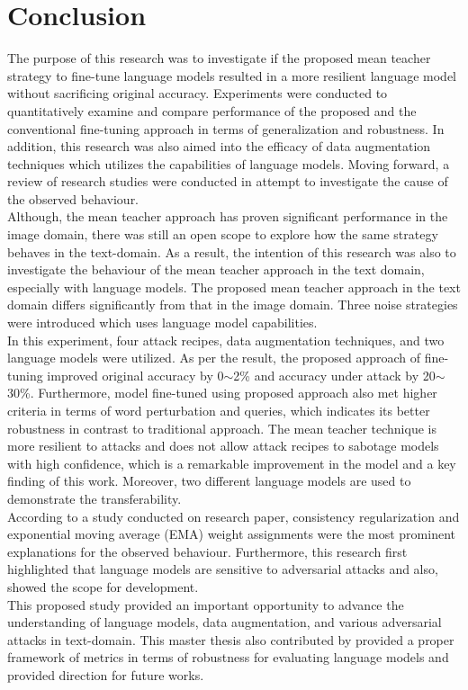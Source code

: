 \documentclass[%
	BCOR=8mm, %
	DIV=12,
	toc=bibliography, %
	toc=listof, %
	oneside, %
	egregdoesnotlikesansseriftitles, %
	]{scrbook}
\begin{document}
\section{Conclusion}
\label{section:conclusion}
The purpose of this research was to investigate if the proposed mean teacher strategy to fine-tune language models resulted in a more resilient language model without sacrificing original accuracy. Experiments were conducted to quantitatively examine and compare performance of the proposed and the conventional fine-tuning approach in terms of generalization and robustness. In addition, this research was also aimed into the efficacy of data augmentation techniques which utilizes the capabilities of language models. Moving forward, a review of research studies were conducted in attempt to investigate the cause of the observed behaviour. \\
Although, the mean teacher approach has proven significant performance in the image domain, there was still an open scope to explore how the same strategy behaves in the text-domain. As a result, the intention of this research was also to investigate the behaviour of the mean teacher approach in the text domain, especially with language models. The proposed mean teacher approach in the text domain differs significantly from that in the image domain. Three noise strategies were introduced which uses language model capabilities.\\
In this experiment, four attack recipes, data augmentation techniques, and two language models were utilized. As per the result, the proposed approach of fine-tuning improved original accuracy by 0$\sim$2\% and accuracy under attack by 20$\sim$30\%. Furthermore, model fine-tuned using proposed approach also met higher criteria in terms of word perturbation and queries, which indicates its better robustness in contrast to traditional approach. The mean teacher technique is more resilient to attacks and does not allow attack recipes to sabotage models with high confidence, which is a remarkable improvement in the model and a key finding of this work. Moreover, two different language models are used to demonstrate the transferability.\\
According to a study conducted on research paper, consistency regularization and exponential moving average (EMA) weight assignments were the most prominent explanations for the observed behaviour.
Furthermore, this research first highlighted that language models are sensitive to adversarial attacks and also, showed the scope for development. \\
This proposed study provided an important opportunity to advance the understanding of language models, data augmentation, and various adversarial attacks in text-domain. This master thesis also contributed by provided a proper framework of metrics  in terms of robustness for evaluating language models and provided direction for future works.
\end{document}
